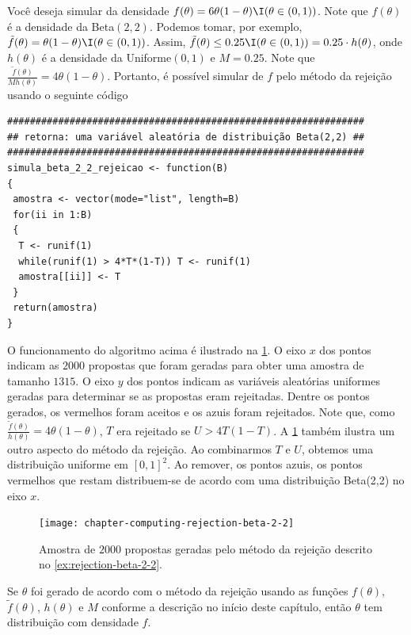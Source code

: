 \begin{example}
 \label{ex:rejection-beta-2-2}
 Você deseja simular da densidade
 $f(\theta) = 6\theta(1-\theta)\I(\theta \in (0,1))$.
 Note que $f(\theta)$ é a densidade da Beta$(2,2)$.
 Podemos tomar, por exemplo,
 $\tilde{f}(\theta) = \theta(1-\theta) \I(\theta \in (0,1))$.
 Assim, $\tilde{f}(\theta) \leq 0.25 \I(\theta \in (0,1)) = 0.25 \cdot h(\theta)$,
 onde $h(\theta)$ é a densidade da
 Uniforme$(0,1)$ e $M=0.25$.
 Note que $\frac{\tilde{f}(\theta)}{M h(\theta)} = 4\theta(1-\theta)$.
 Portanto, é possível simular de $f$ pelo
 método da rejeição 
 usando o seguinte código
 \begin{verbatim}
###############################################################
## retorna: uma variável aleatória de distribuição Beta(2,2) ##
###############################################################
simula_beta_2_2_rejeicao <- function(B)
{
 amostra <- vector(mode="list", length=B)
 for(ii in 1:B)
 {
  T <- runif(1)
  while(runif(1) > 4*T*(1-T)) T <- runif(1)
  amostra[[ii]] <- T
 }
 return(amostra)
}
\end{verbatim}

 O funcionamento do algoritmo acima é ilustrado na
 \cref{fig:rejection-beta-2-2}.
 O eixo $x$ dos pontos indicam as $2000$ propostas que
 foram geradas para obter uma amostra de tamanho $1315$.
 O eixo $y$ dos pontos indicam as
 variáveis aleatórias uniformes geradas para
 determinar se as propostas eram rejeitadas.
 Dentre os pontos gerados, os vermelhos foram aceitos e
 os azuis foram rejeitados.
 Note que, como $\frac{\tilde{f}(\theta)}{h(\theta)} = 4\theta(1-\theta)$,
 $T$ era rejeitado se $U > 4T(1-T)$.
 A \cref{fig:rejection-beta-2-2} também ilustra um
 outro aspecto do método da rejeição.
 Ao combinarmos $T$ e $U$, obtemos uma
 distribuição uniforme em $[0,1]^{2}$.
 Ao remover, os pontos azuis,
 os pontos vermelhos que restam distribuem-se de
 acordo com uma distribuição Beta(2,2) no eixo $x$.
 \begin{figure}
  \centering
  \texttt{[image: chapter-computing-rejection-beta-2-2]}
  \caption{Amostra de $2000$ propostas geradas pelo
  método da rejeição descrito no
  \cref{ex:rejection-beta-2-2}.}
  \label{fig:rejection-beta-2-2}
 \end{figure}
\end{example}

\begin{theorem}
 Se $\theta$ foi gerado de acordo com o
 método da rejeição usando as funções $f(\theta)$,
 $\tilde{f}(\theta)$, $h(\theta)$ e $M$
 conforme a descrição no início deste capítulo,
 então $\theta$ tem distribuição com densidade $f$.
\end{theorem}

